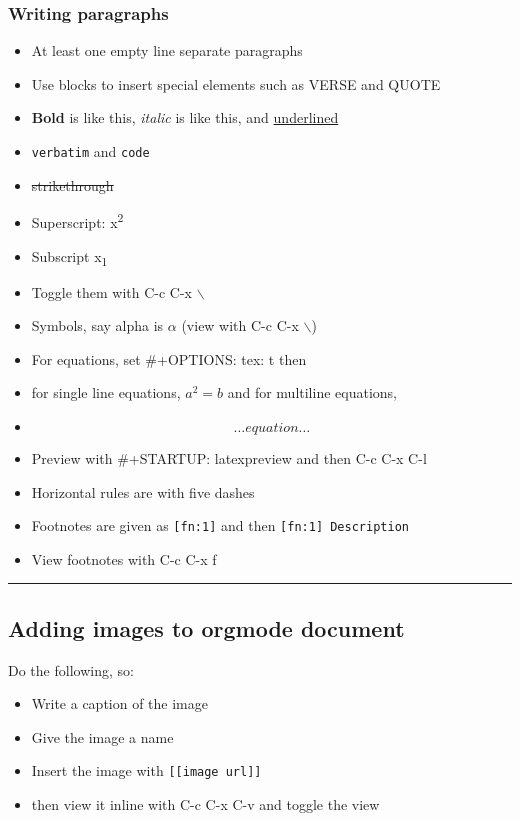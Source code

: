 \documentclass[11pt]{article}
\begin{document}
\subsubsection{Writing paragraphs}
\label{sec:org7cf495a}
\begin{itemize}
\item At least one empty line separate paragraphs
\item Use blocks to insert special elements such as VERSE and QUOTE
\item \textbf{Bold} is like this, \emph{italic} is like this, and \uline{underlined}
\item \texttt{verbatim} and \texttt{code}
\item \sout{strikethrough}
\item Superscript: x\textsuperscript{2}
\item Subscript x\textsubscript{1}
\item Toggle them with C-c C-x $\backslash$
\item Symbols, say alpha is \(\alpha\) (view with C-c C-x $\backslash$)
\item For equations, set \#+OPTIONS: tex: t then
\item for single line equations, \(a^2=b\) and for multiline equations,
\item \begin{equation} \ldots{} equation \ldots{} \end{equation}
\item Preview with \#+STARTUP: latexpreview and then C-c C-x C-l
\item Horizontal rules are with five dashes
\item Footnotes are given as \texttt{[fn:1]} and then \texttt{[fn:1] Description}
\item View footnotes with C-c C-x f
\end{itemize}

\noindent\rule{\textwidth}{0.5pt}

\subsection{Adding images to orgmode document}
\label{sec:org5d4e178}
Do the following, so:
\begin{itemize}
\item Write a caption of the image
\item Give the image a name
\item Insert the image with \texttt{[[image url]]}
\item then view it inline with C-c C-x C-v and toggle the view
\end{itemize}
\end{document}
